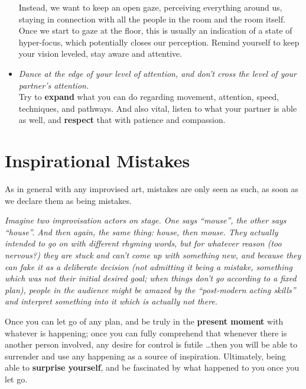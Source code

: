 \begin{itemize}
    Instead, we want to keep an open gaze, perceiving everything around us, staying in connection with all the people in the room and the room itself.
    Once we start to gaze at the floor, this is usually an indication of a state of hyper-focus, which potentially closes our perception.
    Remind yourself to keep your vision leveled, stay aware and attentive.
    \item [] \textit{Dance at the edge of your level of attention, and don't cross the level of your partner's attention.} \\
    Try to \textbf{expand} what you can do regarding movement, attention, speed, techniques, and pathways.
    And also vital, listen to what your partner is able as well, and \textbf{respect} that with patience and compassion.
\end{itemize}

\section{Inspirational Mistakes}\label{sec:inspirational-mistakes}

As in general with any improvised art, mistakes are only seen as such, as soon as we declare them as being mistakes.

\begin{displayquote}
    \textit{
Imagine two improvisation actors on stage.
One says ``mouse'', the other says ``house''.
And then again, the same thing: house, then mouse.
They actually intended to go on with different rhyming words, but for whatever reason (too nervous?) they are stuck and can't come up with something new, and because they can fake it as a deliberate decision (not admitting it being a mistake, something which was not their initial desired goal; when things don't go according to a fixed plan), people in the audience might be amazed by the ``post-modern acting skills'' and interpret something into it which is actually not there.
    }
\end{displayquote}

Once you can let go of any plan, and be truly in the \textbf{present moment} with whatever is happening; once you can fully comprehend that whenever there is another person involved, any desire for control is futile \ldots then you will be able to surrender and use any happening as a source of inspiration.
Ultimately, being able to \textbf{surprise yourself}, and be fascinated by what happened to you once you let go.
